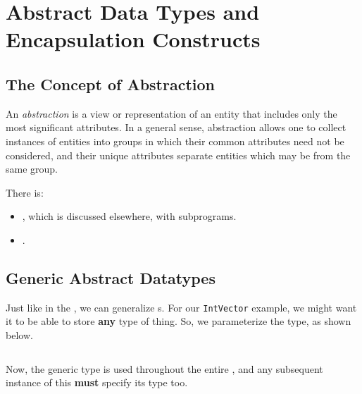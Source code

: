 \section{Abstract Data Types and Encapsulation Constructs}\label{sec:Abstract_Data_Types_Encapsulation_Constructs}
\subsection{The Concept of Abstraction}\label{subsec:Concept_Abstraction}
\begin{definition}[Abstraction]\label{def:Abstraction}
  An \emph{abstraction} is a view or representation of an entity that includes only the most significant attributes.
  In a general sense, abstraction allows one to collect instances of entities into groups in which their common attributes need not be considered, and their unique attributes separate entities which may be from the same group.

  There is:
  \begin{itemize}[noitemsep]
  \item {}, which is discussed elsewhere, with subprograms.
  \item {}.
  \end{itemize}
\end{definition}





\subsection{Generic Abstract Datatypes}\label{subsec:Generic_Abstract_Datatypes}
Just like in the , we can generalize s.
For our \texttt{IntVector} example, we might want it to be able to store \textbf{any} type of thing.
So, we parameterize the  type, as shown below.
\inputminted[frame=lines,linenos]{rust}{./EDAP05-Concepts_Programming_Languages-Sections/Abstract_Data_Types/Code/Generic_Vector.rs}

Now, the generic type  is used throughout the entire , and any subsequent instance of this  \textbf{must} specify its type too.

